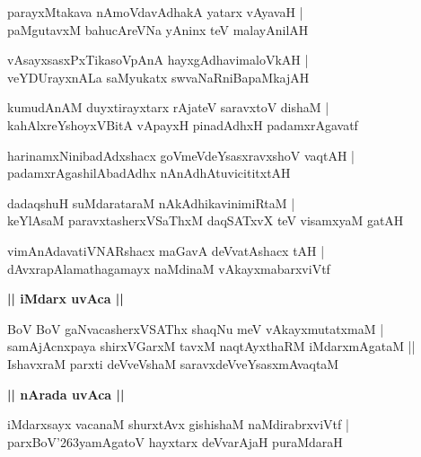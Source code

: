 \documentclass[twoside,12pt,openright]{book}
\def\S{\char'263}
\newcounter{shloka}[chapter]
\def\uvaca#1{\centerline{{\large\textbf{#1}}}}
\begin{document}
\begin{shloka}%
parayxMtakava nAmoVdavAdhakA yatarx vAyavaH |\\
paMgutavxM bahucAreVNa yAninx teV malayAnilAH 
\end{shloka}

\begin{shloka}%
vAsayxsasxPxTikasoVpAnA hayxgAdhavimaloVkAH |\\
veYDUrayxnALa saMyukatx swvaNaRniBapaMkajAH 
\end{shloka}

\begin{shloka}%
kumudAnAM duyxtirayxtarx rAjateV saravxtoV dishaM |\\
kahAlxreYshoyxVBitA vApayxH pinadAdhxH padamxrAgavatf 
\end{shloka}

\begin{shloka}%
harinamxNinibadAdxshacx goVmeVdeYsasxravxshoV vaqtAH |\\
padamxrAgashilAbadAdhx nAnAdhAtuvicititxtAH
\end{shloka}

\begin{shloka}%
dadaqshuH suMdarataraM nAkAdhikavinimiRtaM |\\
keYlAsaM paravxtasherxVSaThxM daqSATxvX teV visamxyaM gatAH 
\end{shloka}

\begin{shloka}%
vimAnAdavatiVNARshacx maGavA deVvatAshacx tAH |\\
dAvxrapAlamathagamayx naMdinaM vAkayxmabarxviVtf 
\end{shloka}

\uvaca{|| iMdarx uvAca ||}

\begin{shloka}%
BoV BoV gaNvacasherxVSAThx shaqNu meV vAkayxmutatxmaM |\\
samAjAcnxpaya shirxVGarxM tavxM naqtAyxthaRM iMdarxmAgataM ||\\
IshavxraM parxti deVveVshaM saravxdeVveYsasxmAvaqtaM 
\end{shloka}

\uvaca{|| nArada uvAca ||}

\begin{shloka}%
iMdarxsayx vacanaM shurxtAvx gishishaM naMdirabrxviVtf |\\
parxBoV\S yamAgatoV hayxtarx deVvarAjaH puraMdaraH 
\end{shloka}
\end{document}
